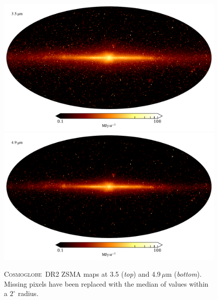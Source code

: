 \documentclass{aa}
\newcommand{\cosmoglobe}{\textsc{Cosmoglobe}}
\begin{document}
\begin{figure}
	\centering
	\includegraphics[width=0.96\linewidth]{figs/map_03.pdf}\\
	\includegraphics[width=0.96\linewidth]{figs/map_04.pdf}
	\caption{\cosmoglobe\ DR2 ZSMA maps at 3.5 (\emph{top}) and
          4.9$\,\mu$m (\emph{bottom}). Missing pixels have been replaced with
          the median of values within a $2^\circ$ radius.}
	\label{fig:freqmaps3_4}
\end{figure}
\end{document}
